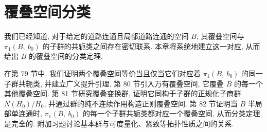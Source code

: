 \chapter{覆叠空间分类}
\label{chapter:ch13}

我们已经知道, 对于给定的道路连通且局部道路连通的空间 $B$, 其覆叠空间与 $\pi_{1}(B,\ b_{0})$ 的子群的共轭类之间存在密切联系. 本章将系统地建立这一对应, 从而给出 $B$ 的覆叠空间的分类定理.

在第 79 节中, 我们证明两个覆叠空间等价当且仅当它们对应着 $\pi_{1}(B,\ b_{0})$ 的同一子群共轭类, 并建立广义提升引理. 第 80 节引入万有覆叠空间, 它覆叠 $B$ 的每一个其他覆叠空间. 第 81 节研究覆叠变换群, 证明它同构于子群的正规化子商群 $N(H_{0})/H_{0}$, 并通过群的纯不连续作用构造正则覆叠空间. 第 82 节证明当 $B$ 半局部单连通时, $\pi_{1}(B,\ b_{0})$ 的每一个子群共轭类都对应一个覆叠空间, 从而分类定理是完全的. 附加习题讨论基本群与可度量化、紧致等拓扑性质之间的关系.






